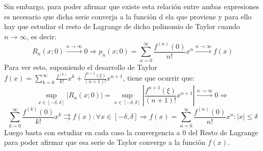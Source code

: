 \documentclass[10pt,a4paper,openright]{book}
\theoremstyle{break}
\begin{document}
Sin embargo, para poder afirmar que existe esta relación entre ambas expresiones es necesario que dicha serie converja a la función d ela que proviene y para ello hay que estudiar el resto de Lagrange de dicho polinomio de Taylor cuando $n\rightarrow \infty$, es decir:
$$R_n(x;0)\xrightarrow{n\rightarrow\infty} 0 \Rightarrow p_n(x;0) = \sum_{n=0}^{\infty} \frac{f^{(n)}(0)}{n!} x^n \xrightarrow{n\rightarrow\infty} f(x)$$
Para ver esto, suponiendo el desarrollo de Taylor $f(x) = \sum_{k=0}^{\infty} \frac{f^{(k)}}{k!} x^k + \frac{f^{n+1} (\xi)}{(n+1)!} x^{n+1}$, tiene que ocurrir que:
$$\underset{x \in [-\delta, \delta]}{\sup} |R_n (x;0)| = \underset{x \in [-\delta, \delta]}{\sup} \left|  \frac{f^{n+1} (\xi)}{(n+1)!} x^{n+1} \right| \overset{n \to \infty} {\longrightarrow} 0 \Rightarrow $$
$$\sum_{k=0}^{\infty} \frac{f^{(k)}(0)}{k!} x^k  \rightrightarrows f(x): \forall x\in [-\delta, \delta] \Rightarrow f(x) = \sum_{n=0}^{\infty} \frac{f^{(n)}(0)}{n!} x^n : |x|\leq \delta$$
Luego basta con estudiar en cada caso la convergencia a 0 del Resto de Lagrange para poder afirmar que esa serie de Taylor converge a la función $f(x)$.
\end{document}
